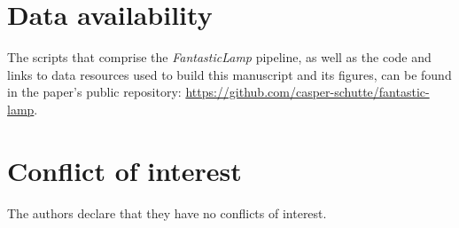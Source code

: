 \documentclass{bioinfo}
\theoremstyle{definition}
\begin{document}
\section*{Data availability}
The scripts that comprise the \textit{FantasticLamp} pipeline, as well as the code and links to data resources used to build this manuscript and its figures, can be found in the paper's public repository: \url{https://github.com/casper-schutte/fantastic-lamp}.

\section*{Conflict of interest}
The authors declare that they have no conflicts of interest.



\end{document}
